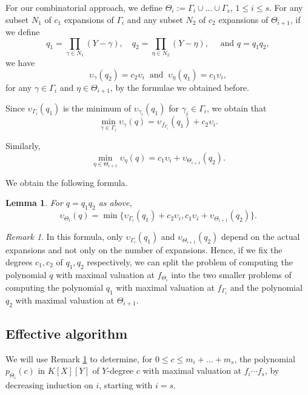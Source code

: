 \documentclass[a4paper,11pt]{amsart}%
\theoremstyle{definition}
\theoremstyle{plain}
\newtheorem{lemma}[defn]{Lemma}
\theoremstyle{remark}
\newtheorem{remark}[defn]{Remark}
\begin{document}
For our combinatorial approach, we define $\Theta_{i} := \Gamma_{i} \cup \dots \cup \Gamma_{s}$, $1 \le i \le s$.
For any subset $N_{1}$ of $c_{1}$ expansions of $\Gamma_{i}$ and any
subset $N_{2}$ of $c_{2}$ expansions of $\Theta_{i+1}$, if we define
$$
q_{1} = \prod_{\gamma\in N_{1}}(Y - \gamma), \quad
q_{2} = \prod_{\eta\in N_{2}}(Y - \eta), \quad
\text{ and } q = q_{1}q_{2},$$
we have
\[
\upsilon_{\gamma}(q_{2}) = c_{2} \upsilon_i \ \text{ and } \ \upsilon_{\eta}(q_{1}) = c_{1} \upsilon_i,
\]
for any $\gamma \in \Gamma_i$ and $\eta \in \Theta_{i+1}$, by the formulae we obtained before.

Since $\upsilon_{{\Gamma_{i}}}(q_{1})$ is the minimum of $\upsilon_{\gamma_{i}}%
(q_{1})$ for $\gamma_{i} \in\Gamma_{i}$, we obtain that
\[
\min_{\gamma\in\Gamma_{i}} \upsilon_{\gamma}(q) = \upsilon_{f_{\Gamma_{i}}}(q_{1}) +
c_{2} \upsilon_i.
\]

Similarly,
\[
\min_{\eta\in\Theta_{i+1}} \upsilon_{\eta}(q) = c_{1} \upsilon_i +
\upsilon_{{\Theta_{i+1}}}(q_{2}).
\]

We obtain the following formula.
\begin{lemma}
\label{formula:pairs}
For $q = q_1 q_2$ as above,
\[\boxed{
\upsilon_{{\Theta_{i}}}(q) = \min\{\upsilon_{{\Gamma_{i}}}(q_{1}) + c_{2} \upsilon_i,
c_{1} \upsilon_i + \upsilon_{{\Theta_{i+1}}}(q_{2})\}.}
\]
\end{lemma}

\begin{remark}
\label{remark:pairs}
In this formula, only $\upsilon_{{\Gamma_{i}}}(q_{1})$ and $\upsilon_{{\Theta_{i+1}}}(q_{2})$ depend on the actual expansions and not only on the number of expansions. Hence, if we fix the degrees $c_1, c_2$ of $q_1, q_2$ respectively, we can split the problem of computing the polynomial $q$ with maximal valuation at $f_{\Theta_{i}}$ into the two smaller problems of computing the polynomial $q_1$ with maximal valuation at $f_{\Gamma_{i}}$ and the polynomial $q_2$ with maximal valuation at ${\Theta_{i+1}}$.
\end{remark}

\subsection{Effective algorithm}
We will use Remark \ref{remark:pairs} to determine, for $0 \leq c \leq m_{i} +
\dots+ m_{s}$, the polynomial $p_{\Theta_{i}}(c)$ in $K[X][Y]$ of $Y$-degree $c$ with maximal valuation at $f_i \cdots f_s$, by decreasing induction on $i$, starting with $i = s$.
\end{document}
